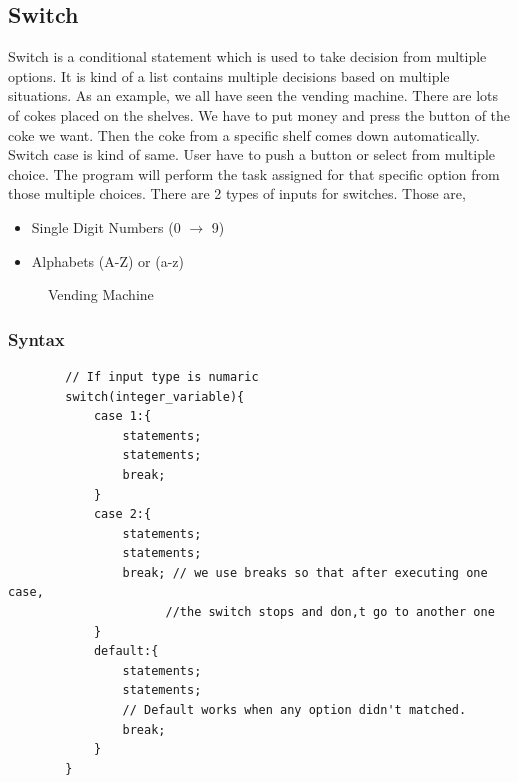 \documentclass[openany]{book}  %
\begin{document}
\begin{flushleft}
    \subsection{Switch}
    Switch is a conditional statement which is used to take decision from multiple options. It is kind of a list contains multiple decisions based on multiple situations.
    As an example, we all have seen the vending machine. There are lots of cokes placed on the shelves. We have to put money and press the button of the coke we want. Then the
    coke from a specific shelf comes down automatically. Switch case is kind of same. User have to push a button or select from multiple choice. The program will perform the task
    assigned for that specific option from those multiple choices. There are 2 types of inputs for switches. Those are,
    \begin{itemize}
        \item Single Digit Numbers (0 $\to$ 9)
        \item Alphabets (A-Z) or (a-z)
    \end{itemize}
    \begin{figure}[htbp]
        \begin{center}
            \caption{Vending Machine\cite{Ref10}}
        \end{center}
    \end{figure}
    \subsubsection{Syntax}
    \begin{center}
        \begin{verbatim}
        // If input type is numaric
        switch(integer_variable){
            case 1:{
                statements;
                statements;
                break;
            }
            case 2:{
                statements;
                statements;
                break; // we use breaks so that after executing one case, 
                      //the switch stops and don,t go to another one
            }
            default:{
                statements;
                statements;
                // Default works when any option didn't matched.
                break;
            }
        }



\end{verbatim}
\end{center}
\end{flushleft}
\end{document}

